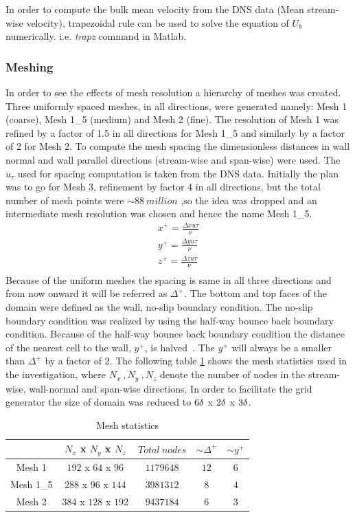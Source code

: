 In order to compute the bulk mean velocity from the DNS data (Mean stream-wise velocity), trapezoidal rule can be used to solve the equation of $U_b$ numerically. i.e. \emph{trapz} command in Matlab. 
\subsubsection{Meshing}
In order to see the effects of mesh resolution a hierarchy of meshes was created. Three uniformly spaced meshes, in all directions, were generated namely: Mesh 1 (coarse), Mesh 1\_5 (medium) and Mesh 2 (fine). The resolution of Mesh 1 was refined by a factor of 1.5 in all directions for Mesh 1\_5 and similarly by a factor of 2 for Mesh 2. To compute the mesh spacing the dimensionless distances in wall normal and wall parallel directions (stream-wise and span-wise) were used. The $u_\tau$ used for spacing computation is taken from the DNS data. Initially the plan was to go for Mesh 3, refinement by factor 4 in all directions, but the total number of mesh points were $\sim 88\ million$ ,so the idea was dropped and an intermediate mesh resolution was chosen and hence the name Mesh 1\_5.
\begin{equation}
\label{Dimensionless distances}
\begin{split}
x^+ = \frac{\Delta x u\tau}{\nu}\\
y^+ = \frac{\Delta y u\tau}{\nu}\\
z^+ = \frac{\Delta z u\tau}{\nu}\\
\end{split}
\end{equation} 
Because of the uniform meshes the spacing is same in all three directions and from now onward it will be referred as $\Delta^+$. The bottom and top faces of the domain were defined as the wall, no-slip boundary condition. The no-slip boundary condition was realized by using the half-way bounce back boundary condition. Because of the half-way bounce back boundary condition the distance of the nearest cell to the wall, $y^+$, is halved~\cite{krueger:book}. The $y^+$ will always be a smaller than $\Delta^+$ by a factor of 2. The following table \ref{Mesh statistics} shows the mesh statistics used in the investigation, where $N_x\ , N_y\ , N_z$ denote the number of nodes in the stream-wise, wall-normal and span-wise directions. In order to facilitate the grid generator the size of domain was reduced to $6\delta$ x $2\delta$ x $3\delta$.
%
\begin{table}[!h]
\centering
\begin{tabular}{c|c|c|c|c}
$ $ & $N_x$ x $N_y$ x $N_z$ & $Total\ nodes$ & $\sim \Delta^+$ & $\sim y^+$ \\
\hline
%
Mesh 1 & $192$ x $64$ x $96$ & $1179648$ &$12$ & $6$ \\
\hline
%
Mesh 1\_5 & $288$ x $96$ x $144$ & $3981312$ & $8$ & $4$   \\
\hline
%
Mesh 2 & $384$ x $128$ x $192$ & $9437184$ &$6$ & $3$ \\
\hline
%
\end{tabular}
\caption{Mesh statistics}
\label{Mesh statistics}
\end{table}\\

